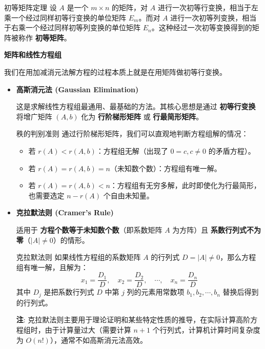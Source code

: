 \documentclass[a4paper,12pt]{ctexart}
\begin{document}
    \begin{mythm}{初等矩阵定理}{}
    设 $A$ 是一个 $m \times n$ 的矩阵，对 $A$ 进行一次初等行变换，相当于左乘一个经过同样初等行变换的单位矩阵 $E_m$。而对 $A$ 进行一次初等列变换，相当于右乘一个经过同样初等列变换的单位矩阵 $E_n$。这种经过一次初等变换得到的矩阵被称作 \textbf{初等矩阵}。
    \end{mythm}

    \textbf{矩阵和线性方程组}
    
    我们在用加减消元法解方程的过程本质上就是在用矩阵做初等行变换。
    
    \begin{itemize}
        \item \textbf{高斯消元法 (Gaussian Elimination)}
        
        这是求解线性方程组最通用、最基础的方法。其核心思想是通过 \textbf{初等行变换} 将增广矩阵 $(A, b)$ 化为 \textbf{行阶梯形矩阵} 或 \textbf{行最简形矩阵}。
        
        \begin{mythm}{秩的判别准则}{}
        通过行阶梯形矩阵，我们可以直观地判断方程组解的情况：
        \begin{itemize}
            \item 若 $r(A) < r(A, b)$：方程组无解（出现了 $0 = c, c\neq0$ 的矛盾方程）。
            \item 若 $r(A) = r(A, b) = n$（未知数个数）：方程组有唯一解。
            \item 若 $r(A) = r(A, b) < n$：方程组有无穷多解，此时即使化为行最简形，也需要选定 $n-r(A)$ 个自由未知量。
        \end{itemize}
        \end{mythm}
        
        \item \textbf{克拉默法则 (Cramer's Rule)}
        
        适用于 \textbf{方程个数等于未知数个数}（即系数矩阵 $A$ 为方阵）且 \textbf{系数行列式不为零}（$|A| \neq 0$）的情形。
        
        \begin{mythm}{克拉默法则}{}
        如果线性方程组的系数矩阵 $A$ 的行列式 $D = |A| \neq 0$，那么方程组有唯一解，且解为：
        \[
        x_1 = \frac{D_1}{D}, \quad x_2 = \frac{D_2}{D}, \quad \cdots, \quad x_n = \frac{D_n}{D}
        \]
        其中 $D_j$ 是把系数行列式 $D$ 中第 $j$ 列的元素用常数项 $b_1, b_2, \cdots, b_n$ 替换后得到的行列式。
        \end{mythm}
        
        \begin{mynote}
        \textbf{注}: 克拉默法则主要用于理论证明和某些特定性质的推导，在实际计算高阶方程组时，由于计算量过大（需要计算 $n+1$ 个行列式，计算机计算时间复杂度为 $O(n!)$），通常不如高斯消元法高效。
        \end{mynote}
    \end{itemize}
\end{document}
